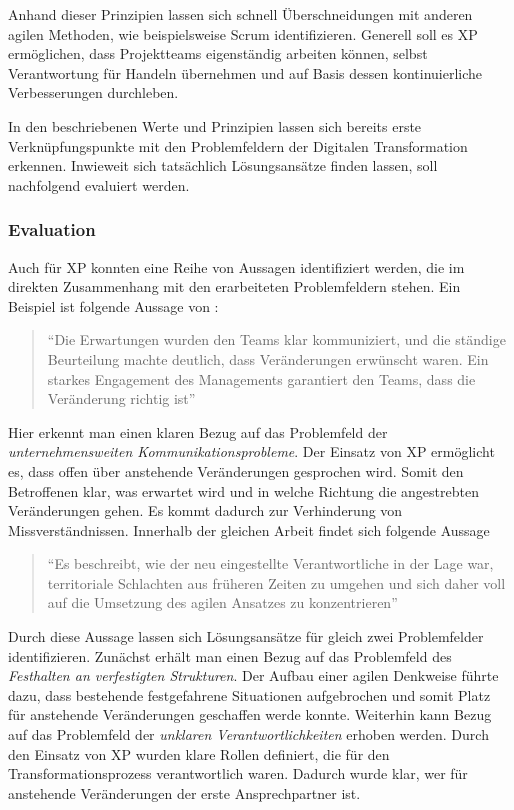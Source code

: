 Anhand dieser Prinzipien lassen sich schnell Überschneidungen mit anderen agilen Methoden, wie beispielsweise Scrum identifizieren. Generell soll es XP ermöglichen, dass Projektteams eigenständig arbeiten können, selbst Verantwortung für Handeln übernehmen und auf Basis dessen kontinuierliche Verbesserungen durchleben.

In den beschriebenen Werte und Prinzipien lassen sich bereits erste Verknüpfungspunkte mit den Problemfeldern der Digitalen Transformation erkennen. Inwieweit sich tatsächlich Lösungsansätze finden lassen, soll nachfolgend evaluiert werden.

\subsubsection{Evaluation}

Auch für XP konnten eine Reihe von Aussagen identifiziert werden, die im direkten Zusammenhang mit den erarbeiteten Problemfeldern stehen. Ein Beispiel ist folgende Aussage von :

\begin{quote}
	``Die Erwartungen wurden den Teams klar kommuniziert, und die ständige Beurteilung machte deutlich, dass Veränderungen erwünscht waren. Ein starkes Engagement des Managements garantiert den Teams, dass die Veränderung richtig ist'' \cite[S. 15]{dikert_challenges_2016}
\end{quote}

Hier erkennt man einen klaren Bezug auf das Problemfeld der \textit{unternehmensweiten Kommunikationsprobleme}. Der Einsatz von XP ermöglicht es, dass offen über anstehende Veränderungen gesprochen wird. Somit den Betroffenen klar, was erwartet wird und in welche Richtung die angestrebten Veränderungen gehen. Es kommt dadurch zur Verhinderung von Missverständnissen. Innerhalb der gleichen Arbeit findet sich folgende Aussage

\begin{quote}
	``Es beschreibt, wie der neu eingestellte Verantwortliche in der Lage war, territoriale Schlachten aus früheren Zeiten zu umgehen und sich daher voll auf die Umsetzung des agilen Ansatzes zu konzentrieren'' \cite[S. 15]{dikert_challenges_2016}
\end{quote}

Durch diese Aussage lassen sich Lösungsansätze für gleich zwei Problemfelder identifizieren. Zunächst erhält man einen Bezug auf das Problemfeld des \textit{Festhalten an verfestigten Strukturen}. Der Aufbau einer agilen Denkweise führte dazu, dass bestehende festgefahrene Situationen aufgebrochen und somit Platz für anstehende Veränderungen geschaffen werde konnte. Weiterhin kann Bezug auf das Problemfeld der \textit{unklaren Verantwortlichkeiten} erhoben werden. Durch den Einsatz von XP wurden klare Rollen definiert, die für den Transformationsprozess verantwortlich waren. Dadurch wurde klar, wer für anstehende Veränderungen der erste Ansprechpartner ist.

